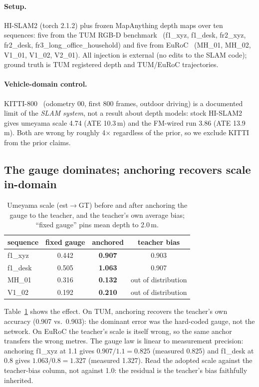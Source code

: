 \paragraph{Setup.} HI-SLAM2 (torch 2.1.2) plus frozen MapAnything depth maps over
ten sequences: five from the TUM RGB-D benchmark~\cite{tumrgbd} (f1\_xyz,
f1\_desk, fr2\_xyz, fr2\_desk, fr3\_long\_office\_household) and five from
EuRoC~\cite{euroc} (MH\_01, MH\_02, V1\_01, V1\_02, V2\_01). All
injection is external (no edits to the SLAM code); ground truth is TUM registered
depth and TUM/EuRoC trajectories.

\paragraph{Vehicle-domain control.} KITTI-800~\cite{kitti} (odometry 00, first 800 frames,
outdoor driving) is a documented limit of the \emph{SLAM system}, not a result
about depth models: stock HI-SLAM2 gives umeyama scale 4.74 (ATE 10.3\,m) and the
FM-wired run 3.86 (ATE 13.9\,m). Both are wrong by roughly 4$\times$ regardless
of the prior, so we exclude KITTI from the prior claims.

\subsection{The gauge dominates; anchoring recovers scale in-domain}

\begin{table}[t]
\centering
\caption{Umeyama scale (est$\to$GT) before and after anchoring the gauge to the
teacher, and the teacher's own average bias; ``fixed gauge'' pins mean depth to
2.0\,m.}
\label{tab:indomain}
\small
\begin{tabular}{@{}lccc@{}}
\toprule
sequence & fixed gauge & anchored & teacher bias \\
\midrule
f1\_xyz & 0.442 & \textbf{0.907} & 0.903 \\
f1\_desk & 0.505 & \textbf{1.063} & 0.907 \\
MH\_01 & 0.316 & \textbf{0.132} & out of distribution \\
V1\_02 & 0.192 & \textbf{0.210} & out of distribution \\
\bottomrule
\end{tabular}
\end{table}

Table~\ref{tab:indomain} shows the effect. On TUM, anchoring recovers the teacher's own accuracy (0.907 vs.\ 0.903): the
dominant error was the hard-coded gauge, not the network. On EuRoC the teacher's
scale is itself wrong, so the same anchor transfers the wrong metres. The gauge
law is linear to measurement precision: anchoring f1\_xyz at 1.1 gives
$0.907/1.1=0.825$ (measured 0.825) and f1\_desk at 0.8 gives $1.063/0.8=1.327$
(measured 1.327). Read the adopted scale against the teacher-bias column, not
against 1.0: the residual is the teacher's bias faithfully inherited.

